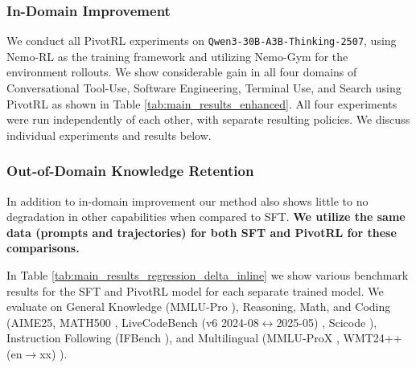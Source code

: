 \subsubsection{In-Domain Improvement}
We conduct all PivotRL experiments on \texttt{Qwen3-30B-A3B-Thinking-2507}, using Nemo-RL \citep{nemo-rl} as the training framework and utilizing Nemo-Gym \citep{nemo-gym} for the environment rollouts. We show considerable gain in all four domains of Conversational Tool-Use, Software Engineering, Terminal Use, and Search using PivotRL as shown in Table \ref{tab:main_results_enhanced}. All four experiments were run independently of each other, with separate resulting policies. We discuss individual experiments and results below.

\subsubsection{Out-of-Domain Knowledge Retention}
In addition to in-domain improvement our method also shows little to no degradation in other capabilities when compared to SFT. \textbf{We utilize the same data (prompts and trajectories) for both SFT and PivotRL for these comparisons.}

In Table \ref{tab:main_results_regression_delta_inline} we show various benchmark results for the SFT and PivotRL model for each separate trained model. We evaluate on General Knowledge (MMLU-Pro \citep{wang2024mmluprorobustchallengingmultitask}), Reasoning, Math, and Coding (AIME25, MATH500 \citep{hendrycks2021measuringmathematicalproblemsolving,lightman2023letsverifystepstep}, LiveCodeBench (v6 2024-08$\leftrightarrow$2025-05) \citep{jain2024livecodebench}, Scicode \citep{tian2024scicoderesearchcodingbenchmark}), Instruction Following (IFBench \citep{pyatkin2025generalizing}), and Multilingual (MMLU-ProX \citep{xuan2025mmluproxmultilingualbenchmarkadvanced}, WMT24++ (en$\rightarrow$xx) \citep{deutsch2025wmt24expandinglanguagecoverage}).

